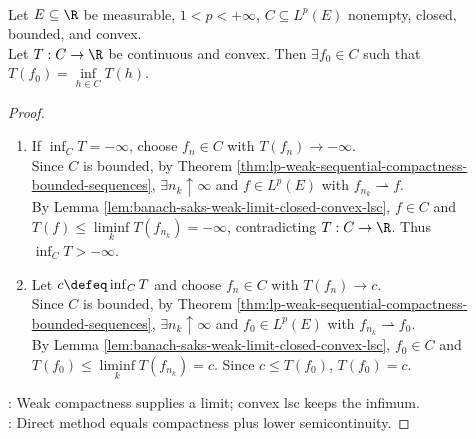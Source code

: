 \begin{theorem} \label{thm:direct-method-convex-functional-lp} \\
Let $E\subseteq\R$ be measurable, $1<p<+\infty$, $C\subseteq L^p(E)$ nonempty, closed, bounded, and convex.\\
Let $T:C\to\R$ be continuous and convex. Then $\exists f_0\in C$ such that $T(f_0)=\inf\limits_{h\in C}T(h)$.
\begin{proof}
\begin{enumerate}[label=(\roman*)]
\setlength{\itemsep}{0pt}
\item If $\inf_{C}T=-\infty$, choose $f_n\in C$ with $T(f_n)\to-\infty$.\\
Since $C$ is bounded, by Theorem \ref{thm:lp-weak-sequential-compactness-bounded-sequences}, $\exists n_k\uparrow\infty$ and $f\in L^p(E)$ with $f_{n_k}\rightharpoonup f$.\\
By Lemma \ref{lem:banach-saks-weak-limit-closed-convex-lsc}, $f\in C$ and $T(f)\leq\liminf\limits_kT(f_{n_k})=-\infty$, contradicting $T:C\to\R$. Thus $\inf_C T>-\infty$.
\item Let $c\defeq\inf_C T$ and choose $f_n\in C$ with $T(f_n)\to c$.\\
Since $C$ is bounded, by Theorem \ref{thm:lp-weak-sequential-compactness-bounded-sequences}, $\exists n_k\uparrow\infty$ and $f_0\in L^p(E)$ with $f_{n_k}\rightharpoonup f_0$.\\
By Lemma \ref{lem:banach-saks-weak-limit-closed-convex-lsc}, $f_0\in C$ and $T(f_0)\leq\liminf\limits_kT(f_{n_k})=c$. Since $c\leq T(f_0)$, $T(f_0)=c$.
\end{enumerate}
: Weak compactness supplies a limit; convex lsc keeps the infimum.\\
: Direct method equals compactness plus lower semicontinuity.
\end{proof}
\end{theorem}

